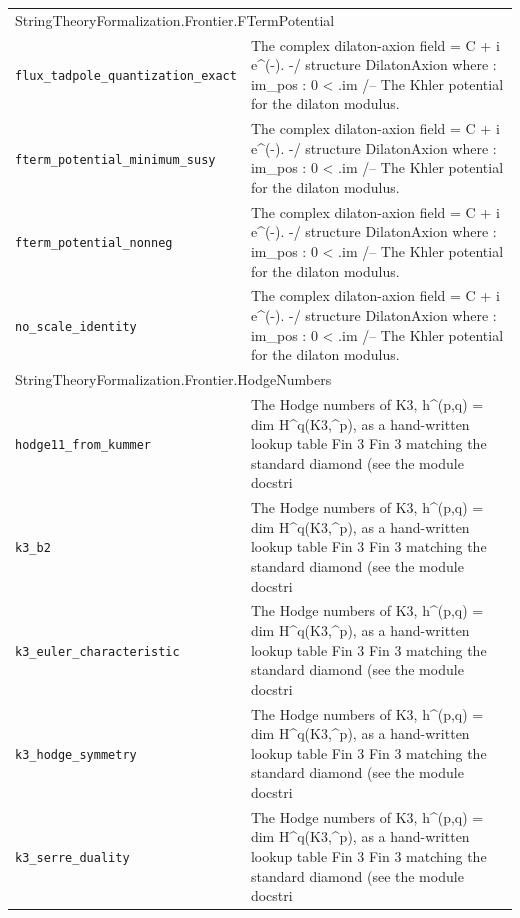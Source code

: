 \begin{longtable}{p{}p{}}
\multicolumn{2}{l}{\textsf{\small StringTheoryFormalization.Frontier.FTermPotential}} \\
\quad\texttt{\footnotesize flux\_tadpole\_quantization\_exact} & {\footnotesize The complex dilaton-axion field  = C + i e\^{}(-). -/ structure DilatonAxion where  :  im\_pos : 0 < .im /-- The Khler potential for the dilaton modulus. } \\
\quad\texttt{\footnotesize fterm\_potential\_minimum\_susy} & {\footnotesize The complex dilaton-axion field  = C + i e\^{}(-). -/ structure DilatonAxion where  :  im\_pos : 0 < .im /-- The Khler potential for the dilaton modulus. } \\
\quad\texttt{\footnotesize fterm\_potential\_nonneg} & {\footnotesize The complex dilaton-axion field  = C + i e\^{}(-). -/ structure DilatonAxion where  :  im\_pos : 0 < .im /-- The Khler potential for the dilaton modulus. } \\
\quad\texttt{\footnotesize no\_scale\_identity} & {\footnotesize The complex dilaton-axion field  = C + i e\^{}(-). -/ structure DilatonAxion where  :  im\_pos : 0 < .im /-- The Khler potential for the dilaton modulus. } \\
\multicolumn{2}{l}{\textsf{\small StringTheoryFormalization.Frontier.HodgeNumbers}} \\
\quad\texttt{\footnotesize hodge11\_from\_kummer} & {\footnotesize The Hodge numbers of K3, h\^{}(p,q) = dim H\^{}q(K3,\^{}p), as a hand-written lookup table Fin 3  Fin 3   matching the standard diamond (see the module docstri} \\
\quad\texttt{\footnotesize k3\_b2} & {\footnotesize The Hodge numbers of K3, h\^{}(p,q) = dim H\^{}q(K3,\^{}p), as a hand-written lookup table Fin 3  Fin 3   matching the standard diamond (see the module docstri} \\
\quad\texttt{\footnotesize k3\_euler\_characteristic} & {\footnotesize The Hodge numbers of K3, h\^{}(p,q) = dim H\^{}q(K3,\^{}p), as a hand-written lookup table Fin 3  Fin 3   matching the standard diamond (see the module docstri} \\
\quad\texttt{\footnotesize k3\_hodge\_symmetry} & {\footnotesize The Hodge numbers of K3, h\^{}(p,q) = dim H\^{}q(K3,\^{}p), as a hand-written lookup table Fin 3  Fin 3   matching the standard diamond (see the module docstri} \\
\quad\texttt{\footnotesize k3\_serre\_duality} & {\footnotesize The Hodge numbers of K3, h\^{}(p,q) = dim H\^{}q(K3,\^{}p), as a hand-written lookup table Fin 3  Fin 3   matching the standard diamond (see the module docstri} \\

\end{longtable}
